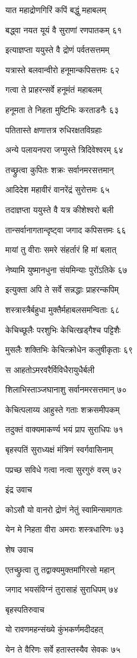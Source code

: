 यात महाद्रोणगिरिं कपिं बद्धुं महाबलम्

बद्ध्वा नयत यूयं वै सुराणां रणपातकम् ६१

इत्याज्ञप्ता ययुस्ते वै द्रोणं पर्वतसत्तमम्

यत्रास्ते बलवान्वीरो हनूमान्कपिसत्तमः ६२

गत्वा ते प्राहरन्सर्वे हनूमंतं महाबलम्

हनूमता ते निहता मुष्टिभिः करताडनैः ६३

पतितास्ते क्षणात्तत्र रुधिरक्षतविग्रहाः

अन्ये पलायनपरा जग्मुस्ते त्रिदिवेश्वरम् ६४

तच्छ्रुत्वा कुपितः शक्रः सर्वानमरसत्तमान्

आदिदेश महावीरं वानरेंद्रं सुरोत्तमः ६५

तदाज्ञप्ता ययुस्ते वै यत्र कीशेश्वरो बली

तान्सर्वानागतान्दृष्ट्वा जगाद कपिसत्तमः ६६

मायां तु वीराः समरे संहर्तारं हि मां बलात्

नेष्यामि युष्मानधुना संयमिन्याः पुरोंऽतिके ६७

इत्युक्ता अपि ते सर्वे सन्नद्धाः प्राहरन्कपिम्

शस्त्रास्त्रैर्बहुधा मुक्तैर्महाबलसमन्विताः ६८

केचिच्छूलैः परशुभिः केचित्खड्गैश्च पट्टिशैः

मुसलैः शक्तिभिः केचित्क्रोधेन कलुषीकृताः ६९

स आहतोऽमरवरैर्विविधैरायुधैर्बली

शिलाभिस्ताञ्जघानाशु सर्वानमरसत्तमान् ७०

केचित्पलाय्य आहुस्ते गताः शक्रसमीपकम्

तदुक्तं वाक्यमाकर्ण्य भयं प्राप सुराधिपः ७१

बृहस्पतिं सुराध्यक्षं मंत्रिणं स्वर्गवासिनाम्

पप्रच्छ सविधे गत्वा नत्वा सुरगुरुं वरम् ७२

इंद्र उवाच

कोऽसौ यो वानरो द्रोणं नेतुं स्वामिन्समागतः

येन मे निहता वीरा अमराः शस्त्रधारिणः ७३

शेष उवाच

एतच्छ्रुत्वा तु तद्वाक्यमुक्तमांगिरसो महान्

जगाद भयसंविग्नं तुरासाहं सुराधिपम् ७४

बृहस्पतिरुवाच

यो रावणमहन्संख्ये कुंभकर्णमदीदहत्

येन ते वैरिणः सर्वे हतास्तस्यैव सेवकः ७५

